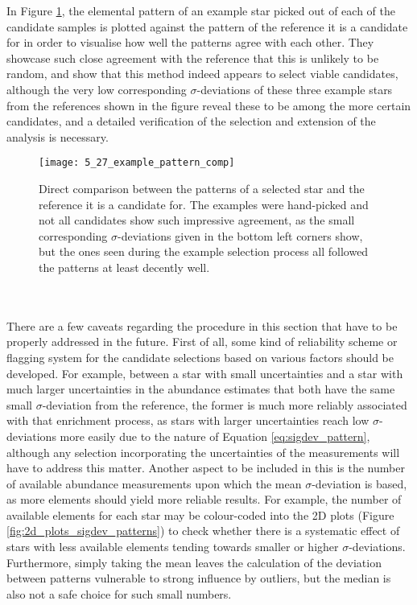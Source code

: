 \documentclass[a4paper,11pt]{article}
\begin{document}
%
In Figure \ref{fig:example_pattern_comp}, the elemental pattern of an example star picked out of each of the candidate samples is plotted against the pattern of the reference it is a candidate for in order to visualise how well the patterns agree with each other. They showcase such close agreement with the reference that this is unlikely to be random, and show that this method indeed appears to select viable candidates, although the very low corresponding $\sigma$-deviations of these three example stars from the references shown in the figure reveal these to be among the more certain candidates, and a detailed verification of the selection and extension of the analysis is necessary.
%
\begin{figure}[ht]
 \centering
 \texttt{[image: 5\_27\_example\_pattern\_comp]}
 \caption[Example of direct comparison between elemental patterns]{Direct comparison between the patterns of a selected star and the reference it is a candidate for. The examples were hand-picked and not all candidates show such impressive agreement, as the small corresponding $\sigma$-deviations given in the bottom left corners show, but the ones seen during the example selection process all followed the patterns at least decently well.}
 \label{fig:example_pattern_comp}
\end{figure}\\ \\
%
There are a few caveats regarding the procedure in this section that have to be properly addressed in the future. First of all, some kind of reliability scheme or flagging system for the candidate selections based on various factors should be developed. For example, between a star with small uncertainties and a star with much larger uncertainties in the abundance estimates that both have the same small $\sigma$-deviation from the reference, the former is much more reliably associated with that enrichment process, as stars with larger uncertainties reach low $\sigma$-deviations more easily due to the nature of Equation \ref{eq:sigdev_pattern}, although any selection incorporating the uncertainties of the measurements will have to address this matter. Another aspect to be included in this is the number of available abundance measurements upon which the mean $\sigma$-deviation is based, as more elements should yield more reliable results. For example, the number of available elements for each star may be colour-coded into the 2D plots (Figure \ref{fig:2d_plots_sigdev_patterns}) to check whether there is a systematic effect of stars with less available elements tending towards smaller or higher $\sigma$-deviations. Furthermore, simply taking the mean leaves the calculation of the deviation between patterns vulnerable to strong influence by outliers, but the median is also not a safe choice for such small numbers.\\ \\
\end{document}
